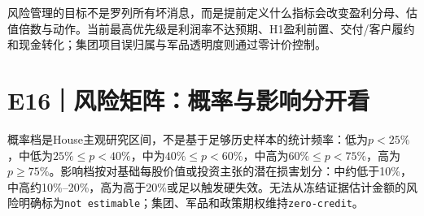 风险管理的目标不是罗列所有坏消息，而是提前定义什么指标会改变盈利分母、估值倍数与动作。当前最高优先级是利润率不达预期、H1盈利前置、交付/客户履约和现金转化；集团项目误归属与军品透明度则通过零计价控制。

\section{E16｜风险矩阵：概率与影响分开看}

概率档是House主观研究区间，不是基于足够历史样本的统计频率：低为\(p<25\%\)，中低为\(25\%\leq p<40\%\)，中为\(40\%\leq p<60\%\)，中高为\(60\%\leq p<75\%\)，高为\(p\geq75\%\)。影响档按对基础每股价值或投资主张的潜在损害划分：中约低于10\%，中高约10\%--20\%，高为高于20\%或足以触发硬失效。无法从冻结证据估计金额的风险明确标为\texttt{not estimable}；集团、军品和政策期权维持\texttt{zero-credit}。

